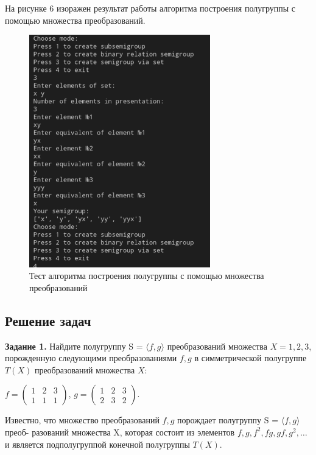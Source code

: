 \documentclass[bachelor, och, labwork]{shiza}
\begin{document}
      На рисунке 6 изоражен результат работы алгоритма построения полугруппы с помощью множества преобразований.

      \begin{figure}[H]
        \centering
        \includegraphics[width=0.7\textwidth]{photo/6.png}
        \caption{Тест алгоритма построения полугруппы с помощью множества преобразований}
      \end{figure}

    \subsection{Решение задач}
      \textbf{Задание 1.} Найдите полугруппу S = $\langle f, g \rangle$ преобразований множества $X = {1, 2, 3}$,
      порожденную следующими преобразованиями $f, g$ в симметрической полугруппе $T(X)$ преобразований множества $X$:
      \begin{center}
        $f = \begin{pmatrix}
          1 & 2 & 3 \\
          1 & 1 & 1
      \end{pmatrix}$,
        $g = \begin{pmatrix}
          1 & 2 & 3 \\
          2 & 3 & 2
        \end{pmatrix}$.
      \end{center}
    Известно, что множество преобразований $f, g$ порождает полугруппу S = $\langle f, g \rangle$ преоб-
    разований множества X, которая состоит из элементов $f, g, f^2 , fg, gf, g^2 , \dots $ и
    является подполугруппой конечной полугруппы $T(X)$.
\end{document}
